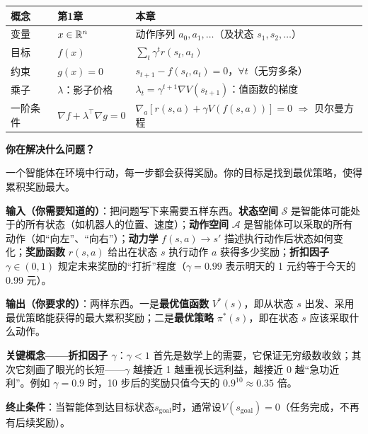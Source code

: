 \begin{center}
\renewcommand{\arraystretch}{1.4}
\small
\begin{tabular}{lll}
\toprule
\textbf{概念} & \textbf{第1章} & \textbf{本章} \\
\midrule
变量 & $x \in \mathbb{R}^n$ & 动作序列 $a_0, a_1, \ldots$（及状态 $s_1, s_2, \ldots$） \\
目标 & $f(x)$ & $\sum_t \gamma^t r(s_t, a_t)$ \\
约束 & $g(x) = 0$ & $s_{t+1} - f(s_t, a_t) = 0$，$\forall t$（无穷多条） \\
乘子 & $\lambda$：影子价格 & $\lambda_t = \gamma^{t+1} \nabla V(s_{t+1})$：值函数的梯度 \\
一阶条件 & $\nabla f + \lambda^\top \nabla g = 0$ & $\nabla_a [r(s,a) + \gamma V(f(s,a))] = 0$ $\Rightarrow$ 贝尔曼方程 \\
\bottomrule
\end{tabular}
\end{center}

\begin{keyidea}
\textbf{你在解决什么问题？}

一个智能体在环境中行动，每一步都会获得奖励。你的目标是找到最优策略，使得累积奖励最大。

\textbf{输入（你需要知道的）}：把问题写下来需要五样东西。\textbf{状态空间} $\mathcal{S}$ 是智能体可能处于的所有状态（如机器人的位置、速度）；\textbf{动作空间} $\mathcal{A}$ 是智能体可以采取的所有动作（如“向左”、“向右”）；\textbf{动力学} $f(s,a) \to s'$ 描述执行动作后状态如何变化；\textbf{奖励函数} $r(s,a)$ 给出在状态 $s$ 执行动作 $a$ 获得多少奖励；\textbf{折扣因子} $\gamma \in (0,1)$ 规定未来奖励的“打折”程度（$\gamma=0.99$ 表示明天的 1 元约等于今天的 0.99 元）。

\textbf{输出（你要求的）}：两样东西。一是\textbf{最优值函数} $V^*(s)$，即从状态 $s$ 出发、采用最优策略能获得的最大累积奖励；二是\textbf{最优策略} $\pi^*(s)$，即在状态 $s$ 应该采取什么动作。

\textbf{关键概念——折扣因子 $\gamma$}：$\gamma < 1$ 首先是数学上的需要，它保证无穷级数收敛；其次它刻画了眼光的长短——$\gamma$ 越接近 1 越重视长远利益，越接近 0 越“急功近利”。例如 $\gamma = 0.9$ 时，10 步后的奖励只值今天的 $0.9^{10} \approx 0.35$ 倍。

\textbf{终止条件}：当智能体到达目标状态$s_{\text{goal}}$时，通常设$V(s_{\text{goal}}) = 0$（任务完成，不再有后续奖励）。
\end{keyidea}

